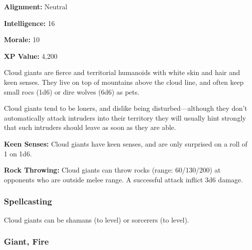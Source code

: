 \begin{multicols*}{2}
{\textbf{Alignment:} Neutral

\textbf{Intelligence:} 16

\textbf{Morale:} 10

\textbf{XP Value:} 4,200}

Cloud giants are fierce and territorial humanoids with white skin and hair and keen senses. They live on top of mountains above the cloud line, and often keep small rocs (1d6) or dire wolves (6d6) as pets.

Cloud giants tend to be loners, and dislike being disturbed—although they don’t automatically attack intruders into their territory they will usually hint strongly that such intruders should leave as soon as they are able.

\textbf{Keen Senses:} Cloud giants have keen senses, and are only surprised on a roll of 1 on 1d6.

\textbf{Rock Throwing:} Cloud giants can throw rocks (range: 60/130/200) at opponents who are outside melee range. A successful attack inflict 3d6 damage.

\subsubsection{Spellcasting}
Cloud giants can be shamans (to  level) or sorcerers (to  level).

\subsubsection{Giant, Fire}
\end{multicols*}
